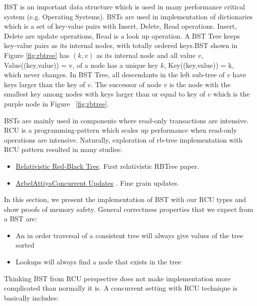 
\textsf{BST} is an important data structure which is used in many performance critical system (e.g. Operating Systems). \textsf{BST}s are used in implementation of dictionaries which is a set of key-value pairs with \textsf{Insert}, \textsf{Delete}, \textsf{Read} operations. \textsf{Insert}, \textsf{Delete} are \textsf{update} operations, \textsf{Read} is a \textsf{look up} operation. A BST Tree keeps key-value pairs as its internal nodes, with totally ordered keys.\textsf{BST} shown in Figure \ref{fig:rbtree} has $(k,v)$ as its internal node and all value $v$, \textsf{Value((key,value)) = v}, of a node has a unique key $k$, \textsf{Key((key,value)) = k},  which never changes. In BST Tree, all descendants in  the left sub-tree of $v$ have keys larger than the key of $v$. The successor of node $v$ is the node with the smallest key among nodes with keys larger than or equal to key of $v$ which is the purple node in Figure ~\ref{fig:rbtree}. 

\textsf{BST}s are mainly used in components where read-only transactions are intensive. RCU is a programming-pattern which scales up performance when read-only operations are intensive. Naturally, exploration of rb-tree implementation with RCU pattern resulted in many studies:
\begin{itemize}
\item \href{http://www.pdx.edu/sites/www.pdx.edu.computer-science/files/tr1006.pdf}{Relativistic Red-Black Tree}. First relativistic RBTree paper.
\item \href{http://www.cs.technion.ac.il/~mayaarl/full-version.pdf}{ArbelAttiyaConcurrent Updates} . Fine grain updates.
\end{itemize}
In this section, we present the implementation of \textsf{BST} with our RCU types and show proofs of memory safety. General correctness properties that we expect from a BST are:
\begin{itemize}
\item An in order traversal of a consistent tree will always give values of the tree sorted
\item Lookups will always find a node that exists in the tree
\end{itemize}
Thinking \textsf{BST} from RCU perspective does not make implementation more complicated than normally it is.  A concurrent setting with RCU technique is basically includes:
